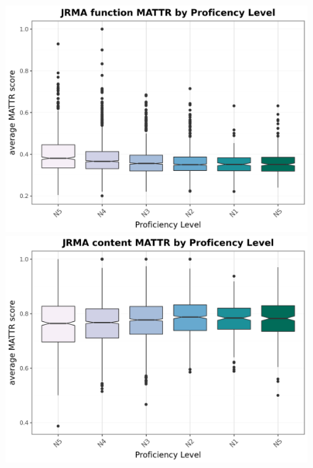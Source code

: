 \begin{figure}[htbp]
    \centering
    \begin{minipage}{.48\textwidth}
        \centering
    \includegraphics[scale=.4]{img/JRMA-MATTRfunction}
    \caption[MATTR function]{}
        \label{fig:MATTRfunction}
    \end{minipage}
    \hfill
\begin{minipage}{.48\textwidth}
        \centering
        \includegraphics[scale=.4]{img/JRMA-MATTRcontent}
        \caption[MATTR content]{}
\label{fig:MATTRcontent}
\end{minipage}
    \end{figure}



